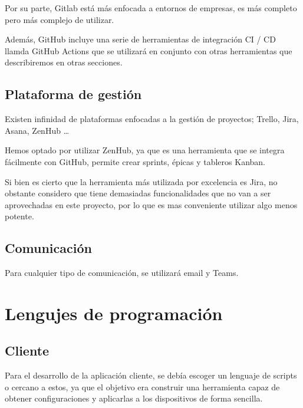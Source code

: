 Por su parte, Gitlab está más enfocada a entornos de empresas, es más completo pero más complejo de utilizar.

Además, GitHub incluye una serie de herramientas de integración CI / CD llamda GitHub Actions que se utilizará en
conjunto con otras herramientas que describiremos en otras secciones.

\subsection{Plataforma de gestión}\label{subsec:plataforma}

Existen infinidad de plataformas enfocadas a la gestión de proyectos; Trello, Jira, Asana, ZenHub \ldots

Hemos optado por utilizar ZenHub\cite{zenhub:gettingstarted}, ya que es una herramienta que se integra fácilmente con GitHub, permite crear
sprints, épicas y tableros Kanban.

Si bien es cierto que la herramienta más utilizada por excelencia es Jira, no obstante considero que tiene demasiadas
funcionalidades que no van a ser aprovechadas en este proyecto, por lo que es mas conveniente utilizar algo menos potente.

\subsection{Comunicación}\label{subsec:comunicacion}

Para cualquier tipo de comunicación, se utilizará email y Teams.

\section{Lengujes de programación}\label{sec:lenguajes}

\subsection{Cliente}\label{subsec:cliente}

Para el desarrollo de la aplicación cliente, se debía escoger un lenguaje de scripts o cercano a estos, ya que el objetivo
era construir una herramienta capaz de obtener configuraciones y aplicarlas a los dispositivos de forma sencilla.

